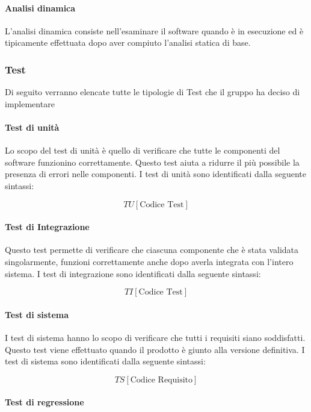 \paragraph{Analisi dinamica }

L'analisi dinamica consiste nell'esaminare il software  quando è in esecuzione ed è tipicamente effettuata dopo aver compiuto l'analisi statica di base.

\subsubsection{Test}
Di seguito verranno elencate tutte le tipologie di Test che il gruppo ha deciso di implementare
\paragraph{Test di unità}

Lo scopo del test di unità è quello di verificare che tutte le componenti
del software funzionino correttamente. Questo test aiuta a ridurre il
più possibile la presenza di errori nelle componenti. 
I test di unità sono identificati dalla seguente sintassi:

$$ TU[\text{Codice Test}] $$

\paragraph{Test di Integrazione }

Questo test permette di verificare che ciascuna componente che è stata
validata singolarmente, funzioni correttamente anche dopo averla
integrata con l'intero sistema. I test di integrazione sono
identificati dalla seguente sintassi: 

$$ TI[\text{Codice Test}] $$

\paragraph{Test di sistema }

I test di sistema hanno lo scopo di verificare che tutti i requisiti
siano soddisfatti. Questo test viene effettuato quando il prodotto è
giunto alla versione definitiva. I test di sistema sono identificati
dalla seguente sintassi: 

$$ TS[\text{Codice Requisito}] $$

\paragraph{Test di regressione }

